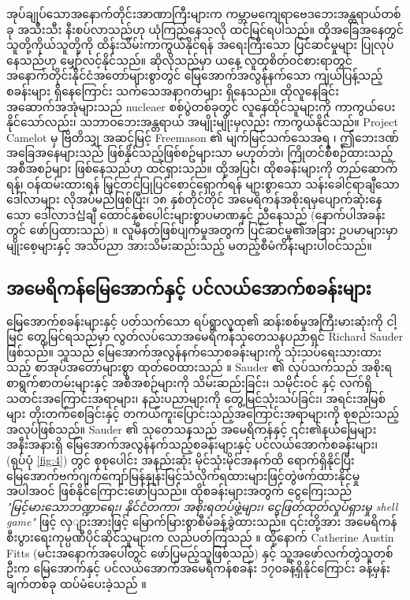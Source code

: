 \documentclass[10pt,twocolumn,letterpaper]{article}
\begin{document}
အုပ်ချုပ်သောအနောက်တိုင်းအာဏာကြီးများက ကမ္ဘာမကျေရာဗေဒဘေးအန္တရာယ်တစ်ခု အသီးသီး နီးစပ်လာသည်ဟု ယုံကြည်နေသလို ထင်မြင်ရပါသည်။ ထိုအခြေအနေတွင် သူတို့ကိုယ်သူတို့ကို ထိန်းသိမ်းကာကွယ်နိုင်ရန် အရေးကြီးသော ပြင်ဆင်မှုများ ပြုလုပ်နေသည်ဟု မျှော်လင့်နိုင်သည်။ ဆိုလိုသည်မှာ ယနေ့ လူထုစိတ်ဝင်စားရာတွင် အနောက်တိုင်းနိုင်ငံအတော်များစွာတွင် မြေအောက်အလွန်နက်သော ကျယ်ပြန့်သည့် စခန်းများ ရှိနေကြောင်း သက်သေအနာဂတ်များ ရှိနေသည်။ ထိုလူနေခြင်းအဆောက်အအုံများသည် nucleaer စစ်ပွဲတစ်ခုတွင် လူနေထိုင်သူများကို ကာကွယ်ပေးနိုင်သော်လည်း၊ သဘာဝဘေးအန္တရာယ် အမျိုးမျိုးမှလည်း ကာကွယ်နိုင်သည်။ Project Camelot မှ ဗြိတိသျှ အဆင့်မြင့် Freemason ၏ မျက်မြင်သက်သေအရ \cite{4,6}၊ ဤဘေးဒဏ်အခြေအနေများသည် ဖြစ်နိုင်သည့်ဖြစ်စဥ်များသာ မဟုတ်ဘဲ၊ ကြိုတင်စီစဉ်ထားသည့်အစီအစဉ်များ ဖြစ်နေသည်ဟု ထင်ရှားသည်။ ထို့အပြင်၊ ထိုစခန်းများကို တည်ဆောက်ရန်၊ ဝန်ထမ်းထားရန် မြှင့်တင်ပြုပြင်စောင့်ရှောက်ရန် များစွာသော သန်းခေါင်ရာချီသောဒေါ်လာများ လိုအပ်မည်ဖြစ်ပြီး၊ ၁၈ နှစ်တိုင်တိုင် အမေရိကန်အစိုးရမှပျောက်ဆုံးနေသော ဒေါ်လာဒ십ချီ ထောင်နှစ်ပေါင်းများစွာပမာဏနှင့် ညီနေသည် (နောက်ပါအခန်းတွင် ဖော်ပြထားသည်) \cite{11,12,13}။ လူမီနတ်ဖြစ်ပျက်မှုအတွက် ပြင်ဆင်မှု၏အခြား ဥပမာများမှာ မျိုးစေ့များနှင့် အသိပညာ အားသိမ်းဆည်းသည့် မတည့်စီမံကိန်းများပါဝင်သည်။

\subsection{အမေရိကန်မြေအောက်နှင့် ပင်လယ်အောက်စခန်းများ}

မြေအောက်စခန်းများနှင့် ပတ်သက်သော ရပ်ရွာလူထု၏ ဆန်းစစ်မှုအကြီးမားဆုံးကို ငါ့မြင် တွေ့မြင်ရသည်မှာ လွတ်လပ်သောအမေရိကန်သုတေသနပညာရှင် Richard Sauder ဖြစ်သည်။ သူသည် မြေအောက်အလွန်နက်သောစခန်းများကို သုံးသပ်ရေးသားထားသည့် စာအုပ်အတော်များစွာ ထုတ်ဝေထားသည် \cite{22}။ Sauder ၏ လုပ်သက်သည် အစိုးရစာရွက်စာတမ်းများနှင့် အစီအစဉ်များကို သိမ်းဆည်းခြင်း၊ သမိုင်းဝင် နှင့် လက်ရှိ သတင်းအကြောင်းအရာများ၊ နည်းပညာများကို တွေ့မြင်သုံးသပ်ခြင်း၊ အရင်းအမြစ်များ တိုးတက်စေခြင်းနှင့် တကယ်ကူးပြောင်းသည့်အကြောင်းအရာများကို စုစည်းသည့်အလုပ်ဖြစ်သည်။ Sauder ၏ သုတေသနသည် အမေရိကန်နှင့် ၎င်း၏နယ်မြေများ အနီးအနားရှိ မြေအောက်အလွန်နက်သည့်စခန်းများနှင့် ပင်လယ်အောက်စခန်းများ၊ (ရုပ်ပုံ \ref{fig:4}) တွင် စုစုပေါင်း အနည်းဆုံး မိုင်သုံးမိုင်အနက်ထိ ရောက်ရှိနိုင်ပြီး မြေအောက်ဗက်ဂျက်ကျော်မြန်နှုန်းမြင့်သံလိုက်ရထားများဖြင့်တွဲဖက်ထားနိုင်မှုအပါအဝင် ဖြစ်နိုင်ကြောင်းဖော်ပြသည်။ ထိုစခန်းများအတွက် ငွေကြေးသည် \textit{"မြင့်မားသောဘဏ္ဍာရေး၊ နိုင်ငံတကာ၊ အစိုးရတပ်ဖွဲ့များ၊ ငွေဖြတ်ထုတ်လှုပ်ရှားမှု shell game"} ဖြင့် လှျားအားဖြင့် မြောက်မြားစွာစီမံခန့်ခွဲထားသည်။ ၎င်းတို့အား အမေရိကန်စီးပွားရေးကုမ္ပဏီပိုင်ဆိုင်သူများက လည်ပတ်ကြသည် \cite{22}။ ထို့နောက် Catherine Austin Fitts (မင်းအနောက်အပေါ်တွင် ဖော်ပြမည့်သူဖြစ်သည်) နှင့် သူ့အဖော်လက်တွဲသူတစ်ဦးက မြေအောက်နှင့် ပင်လယ်အောက်အမေရိကန်စခန်း ၁၇၀ခန့်ရှိနိုင်ကြောင်း ခန့်မှန်းချက်တစ်ခု ထပ်မံပေးခဲ့သည် \cite{16,20}။
\end{document}
